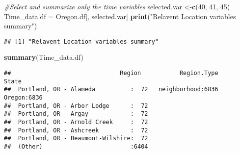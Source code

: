 \documentclass[]{article}
\newenvironment{Shaded}{\begin{snugshade}}{\end{snugshade}}
\newcommand{\KeywordTok}[1]{\textcolor[rgb]{0.13,0.29,0.53}{\textbf{#1}}}
\newcommand{\DataTypeTok}[1]{\textcolor[rgb]{0.13,0.29,0.53}{#1}}
\newcommand{\DecValTok}[1]{\textcolor[rgb]{0.00,0.00,0.81}{#1}}
\newcommand{\StringTok}[1]{\textcolor[rgb]{0.31,0.60,0.02}{#1}}
\newcommand{\CommentTok}[1]{\textcolor[rgb]{0.56,0.35,0.01}{\textit{#1}}}
\newcommand{\OtherTok}[1]{\textcolor[rgb]{0.56,0.35,0.01}{#1}}
\newcommand{\OperatorTok}[1]{\textcolor[rgb]{0.81,0.36,0.00}{\textbf{#1}}}
\newcommand{\NormalTok}[1]{#1}
\begin{document}
\begin{Shaded}
\begin{Highlighting}[]
\CommentTok{#Select and summarize only the time variables }
\NormalTok{selected.var <-}\KeywordTok{c}\NormalTok{(}\DecValTok{40}\NormalTok{, }\DecValTok{41}\NormalTok{, }\DecValTok{45}\NormalTok{)}
\NormalTok{Time_data.df =}\StringTok{ }\NormalTok{Oregon.df[, selected.var]}
\KeywordTok{print}\NormalTok{(}\StringTok{"Relavent Location variables summary"}\NormalTok{)}
\end{Highlighting}
\end{Shaded}

\begin{verbatim}
## [1] "Relavent Location variables summary"
\end{verbatim}

\begin{Shaded}
\begin{Highlighting}[]
\KeywordTok{summary}\NormalTok{(Time_data.df)}
\end{Highlighting}
\end{Shaded}

\begin{verbatim}
##                               Region           Region.Type      State     
##  Portland, OR - Alameda          :  72   neighborhood:6836   Oregon:6836  
##  Portland, OR - Arbor Lodge      :  72                                    
##  Portland, OR - Argay            :  72                                    
##  Portland, OR - Arnold Creek     :  72                                    
##  Portland, OR - Ashcreek         :  72                                    
##  Portland, OR - Beaumont-Wilshire:  72                                    
##  (Other)                         :6404
\end{verbatim}

\begin{Shaded}
\end{Shaded}
\end{document}
